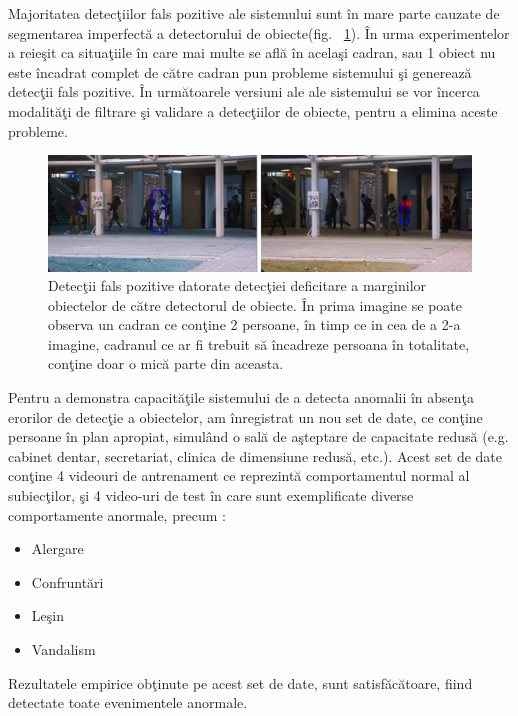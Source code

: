 \documentclass[a4paper,12pt]{report}
\begin{document}
\par Majoritatea detecţiilor fals pozitive ale sistemului sunt în mare parte cauzate de segmentarea imperfectă a detectorului de obiecte(fig.  ~\ref{fig:eroare_detectie}). În urma experimentelor a reieşit ca situaţiile în care mai multe se află în acelaşi cadran, sau 1 obiect nu este încadrat complet de către cadran pun probleme sistemului şi generează detecţii fals pozitive. În următoarele versiuni ale ale sistemului se vor încerca modalităţi de filtrare şi validare a detecţiilor de obiecte, pentru a elimina aceste probleme. 
\begin{figure}[h]
\begin{center}
        \includegraphics[width = 1\textwidth]{images/eroare_detectie}
			 \caption{Detecţii fals pozitive datorate detecţiei deficitare a marginilor obiectelor de către detectorul de obiecte. În prima imagine se poate observa un cadran ce conţine 2 persoane, în timp ce in cea de a 2-a imagine, cadranul ce ar fi trebuit să încadreze persoana în totalitate, conţine doar o mică parte din aceasta.}
			 \label{fig:eroare_detectie}
\end{center}
\end{figure}
\par Pentru a demonstra capacităţile sistemului de a detecta anomalii în absenţa erorilor de detecţie a obiectelor, am înregistrat un nou set de date, ce conţine persoane în plan apropiat, simulând o sală de aşteptare de capacitate redusă (e.g. cabinet dentar, secretariat, clinica de dimensiune redusă, etc.). Acest set de date conţine 4 videouri de antrenament ce reprezintă comportamentul normal al subiecţilor, şi 4 video-uri de test în care sunt exemplificate diverse comportamente anormale, precum :
\begin{itemize}
\item Alergare
\item Confruntări
\item Leşin
\item Vandalism 
\end{itemize}
\par Rezultatele empirice obţinute pe acest set de date, sunt satisfăcătoare, fiind detectate toate evenimentele anormale. 
\end{document}
